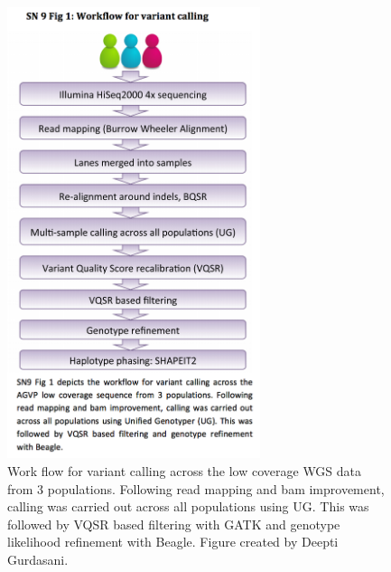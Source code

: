 \begin{figure}[htbp]
\centering
\includegraphics[trim={0 4.25cm 0 0.75cm},clip,width=0.66\textwidth]{fig/SN09f1}
\caption[Variant calling flow diagram.]{Work flow for variant calling across the low coverage \gls{WGS} data from 3 populations. Following read mapping and bam improvement, calling was carried out across all populations using \gls{UG}. This was followed by \gls{VQSR} based filtering with \gls{GATK} and genotype likelihood refinement with Beagle. Figure created by Deepti Gurdasani.}
\label{fig:SN09f1}
\end{figure}